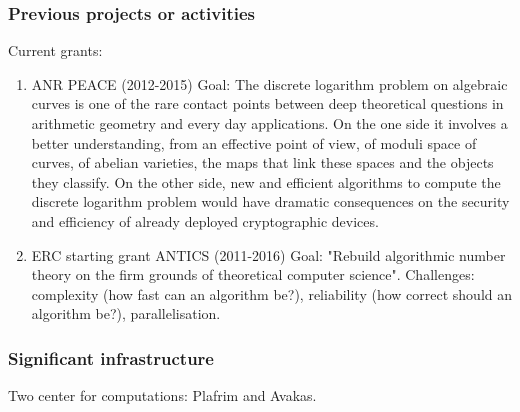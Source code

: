\subsubsection*{Previous projects or activities}

Current grants:
\begin{enumerate}
\item
 ANR PEACE (2012-2015)
    Goal: The discrete logarithm problem on algebraic curves is one of the rare
    contact points between deep theoretical questions in arithmetic geometry and
    every day applications. On the one side it involves a better understanding,
    from an effective point of view, of moduli space of curves, of abelian
    varieties, the maps that link these spaces and the objects they classify.
    On the other side, new and efficient algorithms to compute the discrete
    logarithm problem would have dramatic consequences on the security and
    efficiency of already deployed cryptographic devices. 

\item
ERC starting grant ANTICS (2011-2016) 
    Goal: "Rebuild algorithmic number theory on the firm grounds of theoretical
    computer science".
    Challenges: complexity (how fast can an algorithm be?), reliability
    (how correct should an algorithm be?), parallelisation.
\end{enumerate}

\subsubsection*{Significant infrastructure}

Two center for computations: Plafrim and Avakas.

